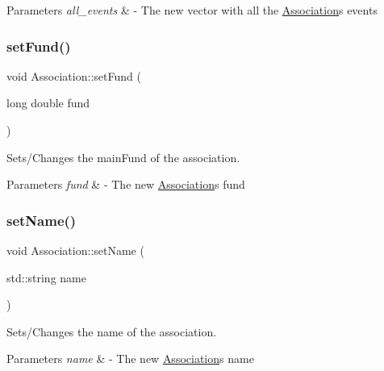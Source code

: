 \begin{DoxyParams}{Parameters}
{\em all\+\_\+events} & -\/ The new vector with all the \mbox{\hyperlink{classAssociation}{Association}}\textquotesingle{}s events \\
\hline
\end{DoxyParams}
\mbox{\label{classAssociation_acbeba5c80457ba1c307c212bcad08b82}} 
\subsubsection{\texorpdfstring{set\+Fund()}{setFund()}}
{\footnotesize\ttfamily void Association\+::set\+Fund (\begin{DoxyParamCaption}\item[{long double}]{fund }\end{DoxyParamCaption})}



Sets/\+Changes the main\+Fund of the association. 


\begin{DoxyParams}{Parameters}
{\em fund} & -\/ The new \mbox{\hyperlink{classAssociation}{Association}}\textquotesingle{}s fund \\
\hline
\end{DoxyParams}
\mbox{\label{classAssociation_a8bd23fd6c727963237bf85a6374ab6d8}} 
\subsubsection{\texorpdfstring{set\+Name()}{setName()}}
{\footnotesize\ttfamily void Association\+::set\+Name (\begin{DoxyParamCaption}\item[{std\+::string}]{name }\end{DoxyParamCaption})}



Sets/\+Changes the name of the association. 


\begin{DoxyParams}{Parameters}
{\em name} & -\/ The new \mbox{\hyperlink{classAssociation}{Association}}\textquotesingle{}s name \\
\hline
\end{DoxyParams}
\mbox{\label{classAssociation_afa9bdcebf905cddc52870dd156a14d54}} 
